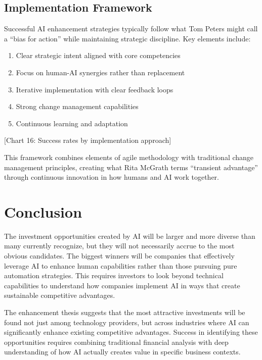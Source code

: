 \documentclass[
  Letterpaper,
]{scrbook}
\providecommand{\tightlist}{%
  \setlength{\itemsep}{0pt}\setlength{\parskip}{0pt}}\usepackage{longtable,booktabs,array}
\begin{document}
\subsection{Implementation Framework}\label{implementation-framework}

Successful AI enhancement strategies typically follow what Tom Peters
might call a ``bias for action'' while maintaining strategic discipline.
Key elements include:

\begin{enumerate}
\def\labelenumi{\arabic{enumi}.}
\tightlist
\item
  Clear strategic intent aligned with core competencies
\item
  Focus on human-AI synergies rather than replacement
\item
  Iterative implementation with clear feedback loops
\item
  Strong change management capabilities
\item
  Continuous learning and adaptation
\end{enumerate}

{[}Chart 16: Success rates by implementation approach{]}

This framework combines elements of agile methodology with traditional
change management principles, creating what Rita McGrath terms
``transient advantage'' through continuous innovation in how humans and
AI work together.

\section{Conclusion}\label{conclusion-2}

The investment opportunities created by AI will be larger and more
diverse than many currently recognize, but they will not necessarily
accrue to the most obvious candidates. The biggest winners will be
companies that effectively leverage AI to enhance human capabilities
rather than those pursuing pure automation strategies. This requires
investors to look beyond technical capabilities to understand how
companies implement AI in ways that create sustainable competitive
advantages.

The enhancement thesis suggests that the most attractive investments
will be found not just among technology providers, but across industries
where AI can significantly enhance existing competitive advantages.
Success in identifying these opportunities requires combining
traditional financial analysis with deep understanding of how AI
actually creates value in specific business contexts.
\end{document}
